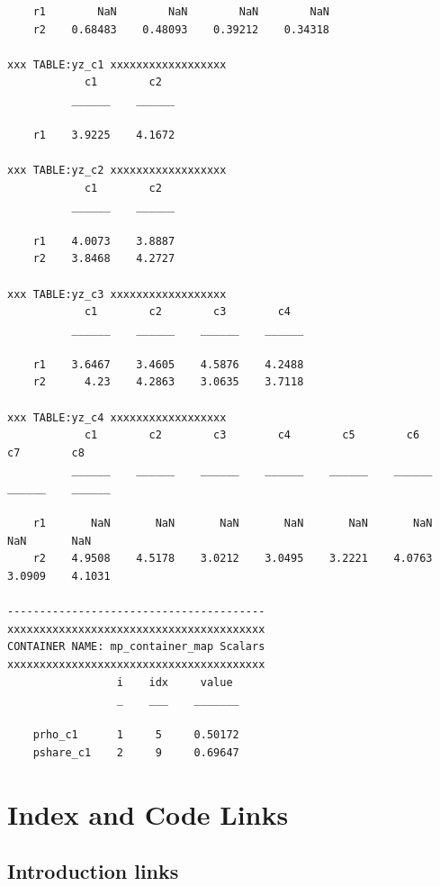 \documentclass[
]{book}
\begin{document}
\begin{verbatim}
    r1        NaN        NaN        NaN        NaN
    r2    0.68483    0.48093    0.39212    0.34318

xxx TABLE:yz_c1 xxxxxxxxxxxxxxxxxx
            c1        c2  
          ______    ______

    r1    3.9225    4.1672

xxx TABLE:yz_c2 xxxxxxxxxxxxxxxxxx
            c1        c2  
          ______    ______

    r1    4.0073    3.8887
    r2    3.8468    4.2727

xxx TABLE:yz_c3 xxxxxxxxxxxxxxxxxx
            c1        c2        c3        c4  
          ______    ______    ______    ______

    r1    3.6467    3.4605    4.5876    4.2488
    r2      4.23    4.2863    3.0635    3.7118

xxx TABLE:yz_c4 xxxxxxxxxxxxxxxxxx
            c1        c2        c3        c4        c5        c6        c7        c8  
          ______    ______    ______    ______    ______    ______    ______    ______

    r1       NaN       NaN       NaN       NaN       NaN       NaN       NaN       NaN
    r2    4.9508    4.5178    3.0212    3.0495    3.2221    4.0763    3.0909    4.1031

----------------------------------------
xxxxxxxxxxxxxxxxxxxxxxxxxxxxxxxxxxxxxxxx
CONTAINER NAME: mp_container_map Scalars
xxxxxxxxxxxxxxxxxxxxxxxxxxxxxxxxxxxxxxxx
                 i    idx     value 
                 _    ___    _______

    prho_c1      1     5     0.50172
    pshare_c1    2     9     0.69647
\end{verbatim}

\hypertarget{appendix-appendix}{%
\appendix}


\hypertarget{index-and-code-links}{%
\chapter{Index and Code Links}\label{index-and-code-links}}

\hypertarget{introduction-links}{%
\section{Introduction links}\label{introduction-links}}
\end{document}

